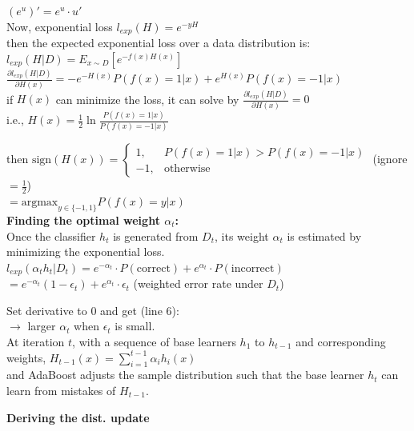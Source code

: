 \documentclass{article}
\begin{document}
$(e^u)' = e^u \cdot u'$ \\
Now, exponential loss $l_{exp}(H) = e^{-yH}$ \\
then the expected exponential loss over a data distribution is: \\

$l_{exp}(H|D) = E_{x \sim D}[e^{-f(x)H(x)}]$\\


$\frac{\partial l_{exp}(H|D)}{\partial H(x)} = -e^{-H(x)}P(f(x)=1|x) + e^{H(x)}P(f(x)=-1|x)$\\


if $H(x)$ can minimize the loss, it can solve by $\frac{\partial l_{exp}(H|D)}{\partial H(x)} = 0$ \\

i.e., $H(x) = \frac{1}{2} \ln \frac{P(f(x)=1|x)}{P(f(x)=-1|x)}$

then $\text{sign}(H(x)) = \begin{cases} 1, & P(f(x)=1|x) > P(f(x)=-1|x) \\ -1, & \text{otherwise} \end{cases}$ (ignore $= \frac{1}{2}$) \\

$= \text{argmax}_{y \in \{-1,1\}} P(f(x)=y|x)$\\


\textbf{Finding the optimal weight $\alpha_t$:} \\
Once the classifier $h_t$ is generated from $D_t$, its weight $\alpha_t$ is estimated by minimizing the exponential loss. \\

$l_{exp}(\alpha_t h_t | D_t) = e^{-\alpha_t} \cdot P(\text{correct}) + e^{\alpha_t} \cdot P(\text{incorrect})$ \\

$= e^{-\alpha_t}(1 - \epsilon_t) + e^{\alpha_t} \cdot \epsilon_t$ (weighted error rate under $D_t$)

Set derivative to 0 and get (line 6): \\
$\rightarrow$ larger $\alpha_t$ when $\epsilon_t$ is small.\\

At iteration $t$, with a sequence of base learners $h_1$ to $h_{t-1}$ and corresponding weights, $H_{t-1}(x) = \sum_{i=1}^{t-1} \alpha_i h_i(x)$ \\
and AdaBoost adjusts the sample distribution such that the base learner $h_t$ can learn from mistakes of $H_{t-1}$.

\textbf{Deriving the dist. update}
\end{document}
